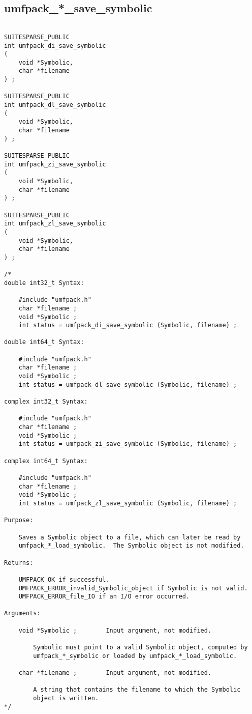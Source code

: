 \documentclass[11pt]{article}
\begin{document}
\newpage
\subsection{umfpack\_*\_save\_symbolic}

{\footnotesize
\begin{verbatim}

SUITESPARSE_PUBLIC
int umfpack_di_save_symbolic
(
    void *Symbolic,
    char *filename
) ;

SUITESPARSE_PUBLIC
int umfpack_dl_save_symbolic
(
    void *Symbolic,
    char *filename
) ;

SUITESPARSE_PUBLIC
int umfpack_zi_save_symbolic
(
    void *Symbolic,
    char *filename
) ;

SUITESPARSE_PUBLIC
int umfpack_zl_save_symbolic
(
    void *Symbolic,
    char *filename
) ;

/*
double int32_t Syntax:

    #include "umfpack.h"
    char *filename ;
    void *Symbolic ;
    int status = umfpack_di_save_symbolic (Symbolic, filename) ;

double int64_t Syntax:

    #include "umfpack.h"
    char *filename ;
    void *Symbolic ;
    int status = umfpack_dl_save_symbolic (Symbolic, filename) ;

complex int32_t Syntax:

    #include "umfpack.h"
    char *filename ;
    void *Symbolic ;
    int status = umfpack_zi_save_symbolic (Symbolic, filename) ;

complex int64_t Syntax:

    #include "umfpack.h"
    char *filename ;
    void *Symbolic ;
    int status = umfpack_zl_save_symbolic (Symbolic, filename) ;

Purpose:

    Saves a Symbolic object to a file, which can later be read by
    umfpack_*_load_symbolic.  The Symbolic object is not modified.

Returns:

    UMFPACK_OK if successful.
    UMFPACK_ERROR_invalid_Symbolic_object if Symbolic is not valid.
    UMFPACK_ERROR_file_IO if an I/O error occurred.

Arguments:

    void *Symbolic ;        Input argument, not modified.

        Symbolic must point to a valid Symbolic object, computed by
        umfpack_*_symbolic or loaded by umfpack_*_load_symbolic.

    char *filename ;        Input argument, not modified.

        A string that contains the filename to which the Symbolic
        object is written.
*/
\end{verbatim}
}
\end{document}
